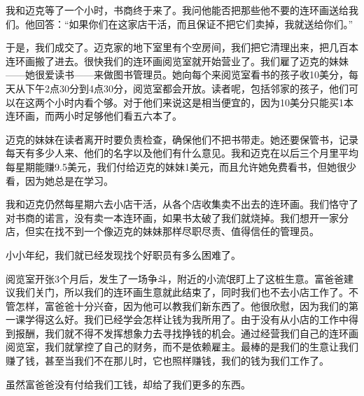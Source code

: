 我和迈克等了一个小时，书商终于来了。我问他能否把那些他不要的连环画送给我们。他回答：“如果你们在这家店干活，而且保证不把它们卖掉，我就送给你们。”

于是，我们成交了。迈克家的地下室里有个空房间，我们把它清理出来，把几百本连环画搬了进去。很快我们的连环画阅览室就开始营业了。我们雇了迈克的妹妹——她很爱读书——来做图书管理员。她向每个来阅览室看书的孩子收10美分，每天从下午2点30分到4点30分，阅览室都会开放。读者呢，包括邻家的孩子，他们可以在这两个小时内看个够。对于他们来说这是相当便宜的，因为10美分只能买1本连环画，而两小时足够他们看五六本了。

迈克的妹妹在读者离开时要负责检查，确保他们不把书带走。她还要保管书，记录每天有多少人来、他们的名字以及他们有什么意见。我和迈克在以后三个月里平均每星期能赚9.5美元，我们付给迈克的妹妹1美元，而且允许她免费看书，但她很少看，因为她总是在学习。

我和迈克仍然每星期六去小店干活，从各个店收集卖不出去的连环画。我们恪守了对书商的诺言，没有卖一本连环画，如果书太破了我们就烧掉。我们想开一家分店，但实在找不到一个像迈克的妹妹那样尽职尽责、值得信任的管理员。

小小年纪，我们就已经发现找个好职员有多么困难了。

阅览室开张3个月后，发生了一场争斗，附近的小流氓盯上了这桩生意。富爸爸建议我们关门，所以我们的连环画生意就此结束了，同时我们也不去小店工作了。不管怎样，富爸爸十分兴奋，因为他可以教我们新东西了。他很欣慰，因为我们的第一课学得这么好。我们已经学会怎样让钱为我所用了。由于没有从小店的工作中得到报酬，我们就不得不发挥想象力去寻找挣钱的机会。通过经营我们自己的连环画阅览室，我们就掌控了自己的财务，而不是依赖雇主。最棒的是我们的生意让我们赚了钱，甚至当我们不在那儿时，它也照样赚钱，我们的钱为我们工作了。

虽然富爸爸没有付给我们工钱，却给了我们更多的东西。

